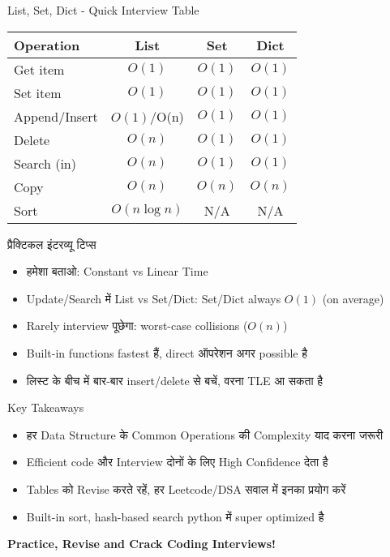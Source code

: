 \documentclass[aspectratio=169]{beamer}
\begin{document}
\begin{frame}{List, Set, Dict - Quick Interview Table}
\centering
\small
\begin{tabular}{lccc}
\rowcolor{GoogleYellow!10}
\textbf{Operation} & \textbf{List} & \textbf{Set} & \textbf{Dict} \\
\midrule
Get item       & $O(1)$    & $O(1)$    & $O(1)$    \\
Set item       & $O(1)$    & $O(1)$    & $O(1)$    \\
Append/Insert  & $O(1)$/O(n) & $O(1)$  & $O(1)$    \\
Delete         & $O(n)$    & $O(1)$    & $O(1)$    \\
Search (in)    & $O(n)$    & $O(1)$    & $O(1)$    \\
Copy           & $O(n)$    & $O(n)$    & $O(n)$    \\
Sort           & $O(n\log n)$ & N/A     & N/A       \\
\end{tabular}
\end{frame}

\begin{frame}{प्रैक्टिकल इंटरव्यू टिप्स}
\begin{itemize}
    \item हमेशा बताओ: Constant vs Linear Time
    \item Update/Search में List vs Set/Dict: Set/Dict always $O(1)$ (on average)
    \item Rarely interview पूछेगा: worst-case collisions ($O(n)$)
    \item Built-in functions fastest हैं, direct ऑपरेशन अगर possible है
    \item लिस्ट के बीच में बार-बार insert/delete से बचें, वरना TLE आ सकता है
\end{itemize}
\end{frame}

\begin{frame}{Key Takeaways}
\begin{itemize}
    \item हर Data Structure के Common Operations की Complexity याद करना जरूरी
    \item Efficient code और Interview दोनों के लिए High Confidence देता है
    \item Tables को Revise करते रहें, हर Leetcode/DSA सवाल में इनका प्रयोग करें
    \item Built-in sort, hash-based search python में super optimized है
\end{itemize}
\centering
\textcolor{GoogleBlue}{\textbf{Practice, Revise and Crack Coding Interviews!}}
\end{frame}
\end{document}
